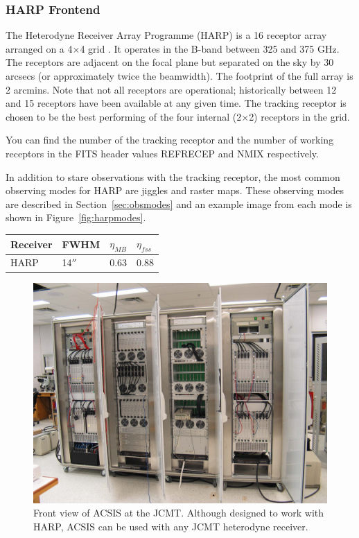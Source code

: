 \documentclass[twoside,11pt]{article}
\newcommand{\htmlref}[2]{#1}
\newcommand{\latexhtml}[2]{#1}
\newcommand{\xlabel}[1]{}
\renewcommand{\_}{\texttt{\symbol{95}}}
\newcommand{\cref}[3]{\latexhtml{#1~\ref{#2}}{\htmlref{#3}{#2}}}
\begin{document}
\subsubsection{\xlabel{harp}HARP Frontend}
The Heterodyne Receiver Array Programme (HARP) is a 16 receptor array arranged on a 4$\times$4 grid \cite{harp}. It operates in the B-band between 325 and 375 GHz. The receptors are adjacent on the focal plane but separated on the sky by 30 arcsecs (or approximately twice the beamwidth). The footprint of the full array is 2 arcmins. Note that not all receptors are operational; historically between 12 and 15 receptors have been available at any given time. The tracking receptor is chosen to be the best performing of the four internal (2$\times$2) receptors in the grid. 

You can find the number of the tracking receptor and the number of working receptors in the FITS header values REFRECEP and N\_MIX respectively.

In addition to stare observations with the tracking receptor, the most common observing modes for HARP are jiggles and raster maps. These observing modes are described in \cref{Section}{sec:obsmodes}{Observing modes} and an example image from each mode is shown in \cref{Figure}{fig:harpmodes}{the figure below}.

\begin{table}[h!]
\begin{center}
\begin{tabular}{|p{1.5cm}|p{1.2cm}|p{0.8cm}|p{0.8cm}|}
\hline
Receiver &FWHM & $\eta_{MB}$ & $\eta_{fss}$\\
\hline
HARP&14$''$ &0.63& 0.88\\
\hline
\end{tabular}
\end{center}
\end{table}


\begin{figure}[b!]
\begin{center}
\includegraphics[width=0.7\linewidth]{sc20_acsis_front_sm}
\caption[Front view of ACSIS at the JCMT]{Front view of ACSIS at the JCMT. Although designed to work with HARP, ACSIS can be used with any JCMT heterodyne receiver.}
\label{fig:acsis}
\end{center}
\end{figure}
\end{document}
